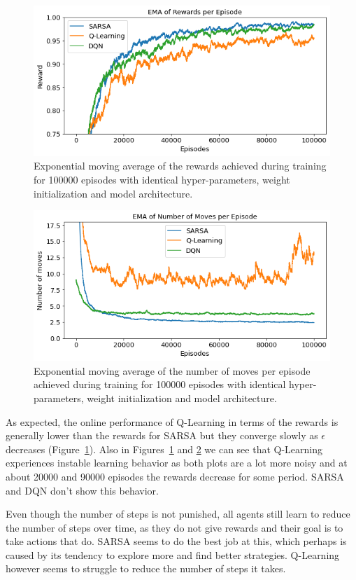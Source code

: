 \documentclass[conference]{IEEEtran}
\begin{document}
\begin{figure}
    \centering
    \includegraphics[width=.49\textwidth]{../figures/ema_rewards_per_episode_comparison.png}
    \caption{Exponential moving average of the rewards achieved during training for 100000 episodes with identical hyper-parameters, weight initialization and model architecture.}
    \label{fig:rewards}
\end{figure}

\begin{figure}
    \centering
    \includegraphics[width=.49\textwidth]{../figures/ema_number_of_moves_per_episode_comparison.png}
    \caption{Exponential moving average of the number of moves per episode achieved during training for 100000 episodes with identical hyper-parameters, weight initialization and model architecture.}
    \label{fig:n_moves}
\end{figure}


As expected, the online performance of Q-Learning in terms of the rewards is generally lower than the rewards for SARSA but they converge slowly as $\epsilon$ decreases (Figure~\ref{fig:rewards}). Also in Figures~\ref{fig:rewards} and \ref{fig:n_moves} we can see that Q-Learning experiences instable learning behavior as both plots are a lot more noisy and at about 20000 and 90000 episodes the rewards decrease for some period. SARSA and DQN don't show this behavior.

Even though the number of steps is not punished, all agents still learn to reduce the number of steps over time, as they do not give rewards and their goal is to take actions that do. SARSA seems to do the best job at this, which perhaps is caused by its tendency to explore more and find better strategies. Q-Learning however seems to struggle to reduce the number of steps it takes.
\end{document}

